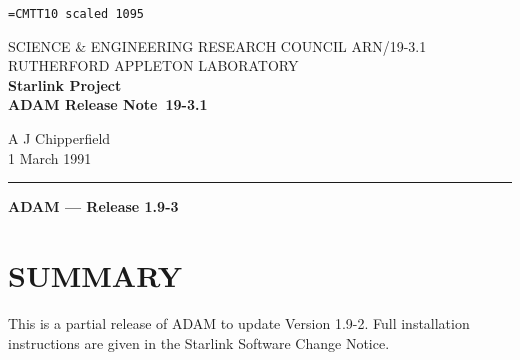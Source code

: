 \pagestyle{myheadings}

\newcommand{\stardoccategory}  {ADAM Release Note}
\newcommand{\stardocinitials}  {ARN}
\newcommand{\stardocnumber}    {19-3.1}
\newcommand{\stardocauthors}   {A J Chipperfield}
\newcommand{\stardocdate}      {1 March 1991}
\newcommand{\stardoctitle}     {ADAM --- Release 1.9-3}

\newcommand{\stardocname}{\stardocinitials /\stardocnumber}
\markright{\stardocname}
\setlength{\textwidth}{160mm}
\setlength{\textheight}{240mm}
\setlength{\topmargin}{-5mm}
\setlength{\oddsidemargin}{0mm}
\setlength{\evensidemargin}{0mm}
\setlength{\parindent}{0mm}
\setlength{\parskip}{\medskipamount}
\setlength{\unitlength}{1mm}


\font\tt=CMTT10 scaled 1095
\renewcommand{\_}{{\tt\char'137}}


\thispagestyle{empty}
SCIENCE \& ENGINEERING RESEARCH COUNCIL \hfill \stardocname\\
RUTHERFORD APPLETON LABORATORY\\
{\large\bf Starlink Project\\}
{\large\bf \stardoccategory\ \stardocnumber}
\begin{flushright}
\stardocauthors\\
\stardocdate
\end{flushright}
\vspace{-4mm}
\rule{\textwidth}{0.5mm}
\vspace{5mm}
\begin{center}
{\Large\bf \stardoctitle}
\end{center}
\vspace{5mm}

\section{SUMMARY}
This is a partial release of ADAM to update Version 1.9-2. 
Full installation instructions are given in the Starlink Software 
Change Notice.

